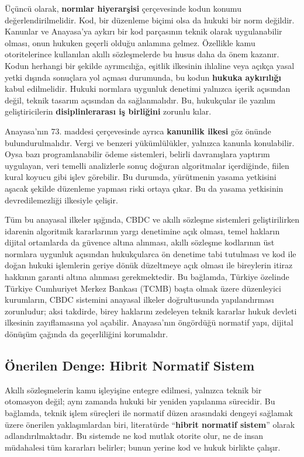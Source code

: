 \documentclass[a4paper,12pt]{article}
\begin{document}
Üçüncü olarak, \textbf{normlar hiyerarşisi} çerçevesinde kodun konumu değerlendirilmelidir. Kod, bir düzenleme biçimi olsa da hukuki bir norm değildir. Kanunlar ve Anayasa’ya aykırı bir kod parçasının teknik olarak uygulanabilir olması, onun hukuken geçerli olduğu anlamına gelmez. Özellikle kamu otoritelerince kullanılan akıllı sözleşmelerde bu husus daha da önem kazanır. Kodun herhangi bir şekilde ayrımcılığa, eşitlik ilkesinin ihlaline veya açıkça yasal yetki dışında sonuçlara yol açması durumunda, bu kodun \textbf{hukuka aykırılığı} kabul edilmelidir. Hukuki normlara uygunluk denetimi yalnızca içerik açısından değil, teknik tasarım açısından da sağlanmalıdır. Bu, hukukçular ile yazılım geliştiricilerin \textbf{disiplinlerarası iş birliğini} zorunlu kılar.\autocite{brownsword2020lawtech}

Anayasa’nın 73. maddesi çerçevesinde ayrıca \textbf{kanunilik ilkesi} göz önünde bulundurulmalıdır. Vergi ve benzeri yükümlülükler, yalnızca kanunla konulabilir. Oysa bazı programlanabilir ödeme sistemleri, belirli davranışlara yaptırım uygulayan, veri temelli analizlerle sonuç doğuran algoritmalar içerdiğinde, fiilen kural koyucu gibi işlev görebilir. Bu durumda, yürütmenin yasama yetkisini aşacak şekilde düzenleme yapması riski ortaya çıkar. Bu da yasama yetkisinin devredilemezliği ilkesiyle çelişir.

Tüm bu anayasal ilkeler ışığında, CBDC ve akıllı sözleşme sistemleri geliştirilirken idarenin algoritmik kararlarının yargı denetimine açık olması, temel hakların dijital ortamlarda da güvence altına alınması, akıllı sözleşme kodlarının üst normlara uygunluk açısından hukukçularca ön denetime tabi tutulması ve kod ile doğan hukuki işlemlerin geriye dönük düzeltmeye açık olması ile bireylerin itiraz hakkının garanti altına alınması gerekmektedir. Bu bağlamda, Türkiye özelinde Türkiye Cumhuriyet Merkez Bankası (TCMB) başta olmak üzere düzenleyici kurumların, CBDC sistemini anayasal ilkeler doğrultusunda yapılandırması zorunludur; aksi takdirde, birey haklarını zedeleyen teknik kararlar hukuk devleti ilkesinin zayıflamasına yol açabilir. Anayasa’nın öngördüğü normatif yapı, dijital dönüşüm çağında da geçerliliğini korumalıdır.


\subsection{Önerilen Denge: Hibrit Normatif Sistem}

Akıllı sözleşmelerin kamu işleyişine entegre edilmesi, yalnızca teknik bir otomasyon değil; aynı zamanda hukuki bir yeniden yapılanma sürecidir. Bu bağlamda, teknik işlem süreçleri ile normatif düzen arasındaki dengeyi sağlamak üzere önerilen yaklaşımlardan biri, literatürde ``\textbf{hibrit normatif sistem}''  olarak adlandırılmaktadır. Bu sistemde ne kod mutlak otorite olur, ne de insan müdahalesi tüm kararları belirler; bunun yerine kod ve hukuk birlikte çalışır.
\end{document}
